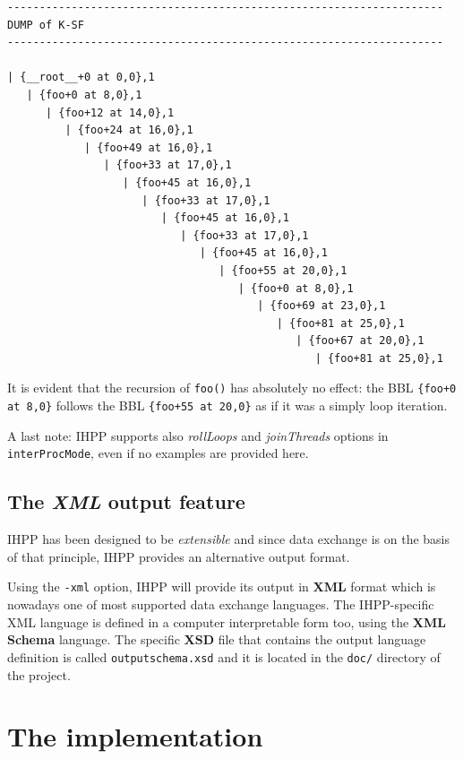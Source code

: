 \documentclass[a4paper,11pt]{report}
\begin{document}
\begin{lstlisting}[label=out14, 
caption={partial output of IHPP analysis in \texttt{interProcMode} of \texttt{prog4}}]
--------------------------------------------------------------------
DUMP of K-SF
--------------------------------------------------------------------

| {__root__+0 at 0,0},1
   | {foo+0 at 8,0},1
      | {foo+12 at 14,0},1
         | {foo+24 at 16,0},1
            | {foo+49 at 16,0},1
               | {foo+33 at 17,0},1
                  | {foo+45 at 16,0},1
                     | {foo+33 at 17,0},1
                        | {foo+45 at 16,0},1
                           | {foo+33 at 17,0},1
                              | {foo+45 at 16,0},1
                                 | {foo+55 at 20,0},1
                                    | {foo+0 at 8,0},1
                                       | {foo+69 at 23,0},1
                                          | {foo+81 at 25,0},1
                                             | {foo+67 at 20,0},1
                                                | {foo+81 at 25,0},1

\end{lstlisting}

\noindent
It is evident that the recursion of \verb|foo()| has absolutely no effect:
the BBL \verb|{foo+0 at 8,0}| follows the BBL \verb|{foo+55 at 20,0}| as if 
it was a simply loop iteration.

A last note: IHPP supports also \emph{rollLoops} and \emph{joinThreads} options
in \verb|interProcMode|, even if no examples are provided here.

\section{The \emph{XML} output feature}

IHPP has been designed to be \emph{extensible} and since data exchange is on the basis
of that principle, IHPP provides an alternative output format.

Using the \verb|-xml| option, IHPP will provide its output in \textbf{XML} format
which is nowadays one of most supported data exchange languages.
The IHPP-specific XML language is defined in a computer interpretable form too, 
using the \textbf{XML Schema} language. 
The specific \textbf{XSD} file that contains the output language definition 
is called \verb|outputschema.xsd| and it is located in the \verb|doc/| directory
of the project.

\chapter{The implementation}
\end{document}
